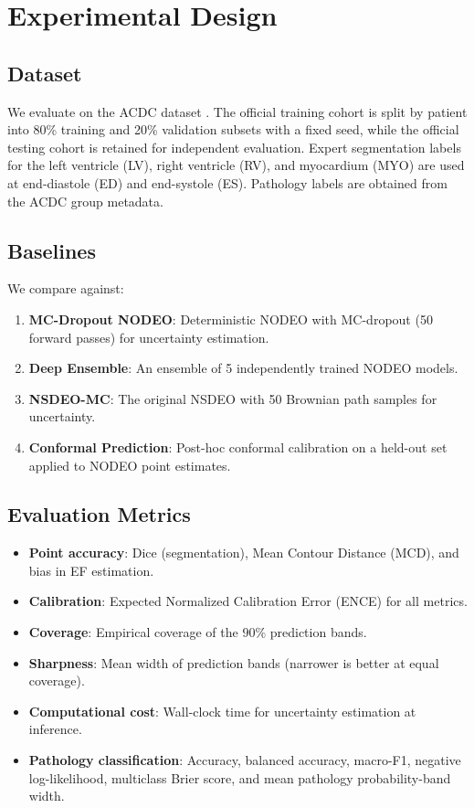 \documentclass[10pt,twocolumn]{article}
\begin{document}
\section{Experimental Design}
\label{sec:experiments}

\subsection{Dataset}

We evaluate on the ACDC dataset \cite{bernard2018deep}. The official training cohort is split by patient into 80\% training and 20\% validation subsets with a fixed seed, while the official testing cohort is retained for independent evaluation. Expert segmentation labels for the left ventricle (LV), right ventricle (RV), and myocardium (MYO) are used at end-diastole (ED) and end-systole (ES). Pathology labels are obtained from the ACDC group metadata.

\subsection{Baselines}

We compare against:
\begin{enumerate}
    \item \textbf{MC-Dropout NODEO}: Deterministic NODEO with MC-dropout (50 forward passes) for uncertainty estimation.
    \item \textbf{Deep Ensemble}: An ensemble of 5 independently trained NODEO models.
    \item \textbf{NSDEO-MC}: The original NSDEO with 50 Brownian path samples for uncertainty.
    \item \textbf{Conformal Prediction}: Post-hoc conformal calibration on a held-out set applied to NODEO point estimates.
\end{enumerate}

\subsection{Evaluation Metrics}

\begin{itemize}
    \item \textbf{Point accuracy}: Dice (segmentation), Mean Contour Distance (MCD), and bias in EF estimation.
    \item \textbf{Calibration}: Expected Normalized Calibration Error (ENCE) \cite{levi2022evaluating} for all metrics.
    \item \textbf{Coverage}: Empirical coverage of the $90\%$ prediction bands.
    \item \textbf{Sharpness}: Mean width of prediction bands (narrower is better at equal coverage).
    \item \textbf{Computational cost}: Wall-clock time for uncertainty estimation at inference.
    \item \textbf{Pathology classification}: Accuracy, balanced accuracy, macro-F1, negative log-likelihood, multiclass Brier score, and mean pathology probability-band width.
\end{itemize}
\end{document}
